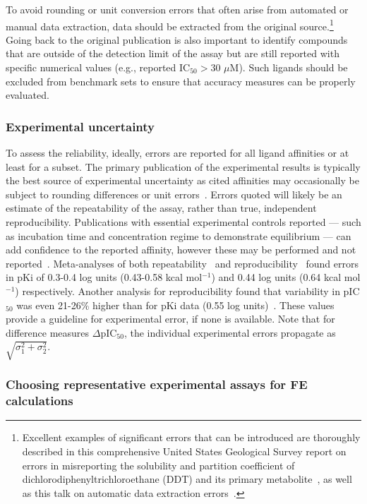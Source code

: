 \documentclass[9pt,bestpractices,pubversion]{livecoms}
\begin{document}
To avoid rounding or unit conversion errors that often arise from automated or manual data extraction, data should be extracted from the original source.\footnote{Excellent examples of significant errors that can be introduced are thoroughly described in this comprehensive United States Geological Survey report on errors in misreporting the solubility and partition coefficient of dichlorodiphenyltrichloroethane (DDT) and its primary metabolite~\cite{pontolillo2001search}, as well as this talk on automatic data extraction errors~\cite{daga_pankaj_r_2019_3445476}.}
Going back to the original publication is also important to identify compounds that are outside of the detection limit of the assay but are still reported with specific numerical values (e.g., reported IC$_{50} > 30 \,\,\mu$M). Such ligands should be excluded from benchmark sets to ensure that accuracy measures can be properly evaluated.

\subsubsection{Experimental uncertainty}
\label{sec:exp_uncertainty}
To assess the reliability, ideally, errors are reported for all ligand affinities or at least for a subset. The primary publication of the experimental results is typically the best source of experimental uncertainty as cited affinities may occasionally be subject to rounding differences or unit errors~\cite{kramer2012experimental}. Errors quoted will likely be an estimate of the repeatability of the assay, rather than true, independent reproducibility. Publications with essential experimental controls reported --- such as incubation time and concentration regime to demonstrate equilibrium --- can add confidence to the reported affinity, however these may be performed and not reported~\cite{jarmoskaite2020measure}. Meta-analyses of both repeatability~\cite{sheridan2020experimental} and reproducibility~\cite{kramer2012experimental} found errors in pKi of 0.3-0.4 log units (0.43-0.58 kcal mol$^{-1}$) and 0.44 log units (0.64 kcal mol$^{-1}$) respectively.  Another analysis for reproducibility found that variability in pIC$_{50}$ was even 21-26\% higher than for pKi data (0.55 log units)~\cite{kalliokoski_comparability_2013}. These values provide a guideline for experimental error, if none is available. Note that for difference measures $\Delta $pIC$_{50}$, the individual experimental errors propagate as $\sqrt{\sigma_1^2+\sigma_2^2}$.

\subsubsection{Choosing representative experimental assays for FE calculations}
\end{document}
